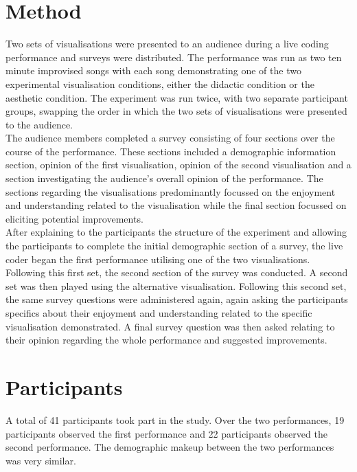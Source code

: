 \documentclass{article}
\begin{document}
\section{Method}
Two sets of visualisations were presented to an audience during a live coding performance and surveys were distributed. The performance was run as two ten minute improvised songs with each song demonstrating one of the two experimental visualisation conditions, either the didactic condition or the aesthetic condition. The experiment was run twice, with two separate participant groups, swapping the order in which the two sets of visualisations were presented to the audience.\\

The audience members completed a survey consisting of four sections over the course of the performance. These sections included a demographic information section, opinion of the first visualisation, opinion of the second visualisation and a section investigating the audience's overall opinion of the performance. The sections regarding the visualisations predominantly focussed on the enjoyment and understanding related to the visualisation while the final section focussed on eliciting potential improvements.\\

After explaining to the participants the structure of the experiment and allowing the participants to complete the initial demographic section of a survey, the live coder began the first performance utilising one of the two visualisations. Following this first set, the second section of the survey was conducted. A second set was then played using the alternative visualisation. Following this second set, the same survey questions were administered again, again asking the participants specifics about their enjoyment and understanding related to the specific visualisation demonstrated. A final survey question was then asked relating to their opinion regarding the whole performance and suggested improvements.

\section{Participants}

A total of 41 participants took part in the study. Over the two performances, 19 participants observed the first performance and 22 participants observed the second performance. The demographic makeup between the two performances was very similar.\\
\end{document}

